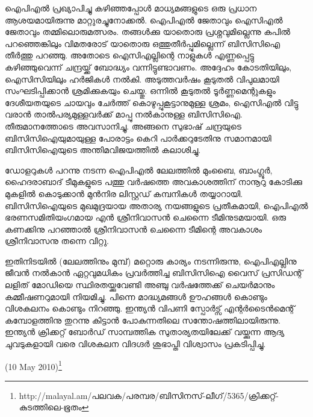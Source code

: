 

ഐപിഎല്‍ പ്രഖ്യാപിച്ചു കഴിഞ്ഞപ്പോള്‍ മാധ്യമങ്ങളുടെ ഒരു പ്രധാന ആശയമായിരുന്നു മാറ്റുരച്ചുനോക്കല്‍. ഐപിഎല്‍ 
ജേതാവും ഐസിഎല്‍ ജേതാവും തമ്മിലൊരുമത്സരം. തങ്ങള്‍ക്കു യാതൊരു പ്രശ്നവുമില്ലെന്നു കപില്‍ പറഞ്ഞെങ്കിലും 
വിമതരോട് യാതൊരു ഒത്തുതീര്‍പ്പുമില്ലെന്ന് ബിസിസിഐ തീര്‍ത്തു പറഞ്ഞു. അതോടെ ഐസിഎല്ലിന്റെ നാളുകള്‍ 
എണ്ണപ്പെട്ടു കഴിഞ്ഞുവെന്ന് ചന്ദ്രയ്ക്ക് ബോദ്ധ്യം വന്നിട്ടുണ്ടാവണം. അദ്ദേഹം കോടതിയിലും, ഐസിസിയിലും ഹര്‍ജികള്‍ 
നല്‍കി. അടുത്തവര്‍ഷം കൂടുതല്‍ വിപുലമായി സംഘടിപ്പിക്കാന്‍ ശ്രമിക്കുകയും ചെയ്തു. ഒന്നില്‍ കൂടുതല്‍ ടൂര്‍ണ്ണമെന്റുകളും 
ദേശീയതയുടെ ചായവും ചേര്‍ത്ത് കൊഴുപ്പുകൂട്ടാനുമുള്ള ശ്രമം, ഐസിഎല്‍ വിട്ടു വരാന്‍ താല്‍പര്യമുള്ളവര്‍ക്ക് മാപ്പു 
നല്‍കാനുള്ള ബിസിസിഐ. തീരുമാനത്തോടെ അവസാനിച്ചു. അങ്ങനെ സുഭാഷ് ചന്ദ്രയുടെ ബിസിസിഐയുമായുള്ള 
പോരാട്ടം കെറി പാര്‍ക്കറുടേതിനു സമാനമായി ബിസിസിഐയുടെ അന്തിമവിജയത്തില്‍ കലാശിച്ചു.

ഡോളറുകള്‍ പറന്നു നടന്ന ഐപിഎല്‍ ലേലത്തില്‍ മുംബൈ, ബാംഗ്ലൂര്‍, ഹൈദരാബാദ് ടീമുകളുടെ പത്തു വര്‍ഷത്തെ 
അവകാശത്തിന് നാനൂറു കോടിക്കു മുകളില്‍ കൊടുക്കാന്‍ മുന്‍നിര ലിസ്റ്റഡ് കമ്പനികള്‍ തയ്യാറായി. ബിസിസിഐയുടെ 
മുഖമുദ്രയായ അതാര്യ നയങ്ങളുടെ പ്രതീകമായി, ഐപിഎല്‍ ഭരണസമിതിയംഗമായ എന്‍ ശ്രീനിവാസന്‍ ചെന്നൈ 
ടീമിനുടമയായി. ഒരു കണക്കിനു പറഞ്ഞാല്‍ ശ്രീനിവാസന്‍ ചെന്നൈ ടീമിന്റെ അവകാശം ശ്രീനിവാസനു തന്നെ വിറ്റു.

ഇതിനിടയില്‍ (ലേലത്തിനും മുമ്പ്) മറ്റൊരു കാര്യം നടന്നിരുന്നു, ഐപിഎല്ലിനു ജീവന്‍ നല്‍കാന്‍ ഏറ്റവുമധികം പ്രവര്‍ത്തിച്ച 
ബിസിസിഐ വൈസ് പ്രസിഡന്റ് ലളിത് മോഡിയെ സ്ഥിരതയ്ക്കുവേണ്ടി അഞ്ചു വര്‍ഷത്തേക്ക് ചെയര്‍മാനും കമ്മീഷണറുമായി 
നിയമിച്ചു. പിന്നെ മാദ്ധ്യമങ്ങള്‍ ഊഹങ്ങള്‍ കൊണ്ടും വിശകലനം കൊണ്ടും നിറഞ്ഞു. ഇന്ത്യന്‍ വിപണി സ്പോര്‍ട്സ് 
എന്റര്‍ടൈന്‍മെന്റ് കമ്പോളത്തിനു തുറന്നു കിട്ടാന്‍ പോകുന്നതിലെ സന്തോഷത്തിലായിരുന്നു. ഇന്ത്യന്‍ ക്രിക്കറ്റ് ബോര്‍ഡ് 
സാമ്പത്തിക സുതാര്യതയിലേക്ക് വയ്ക്കുന്ന ആദ്യ ചുവടുകളായി വരെ വിശകലന വിദഗ്ദര്‍ ശുഭാപ്തി വിശ്വാസം പ്രകടിപ്പിച്ചു.

(10 May 2010)\footnote{http://malayal.am/പലവക/പരമ്പര/ബിസിനസ്-ലീഗ്/5365/ക്രിക്കറ്റ്-കുടത്തിലെ-ഭൂതം}

\newpage
